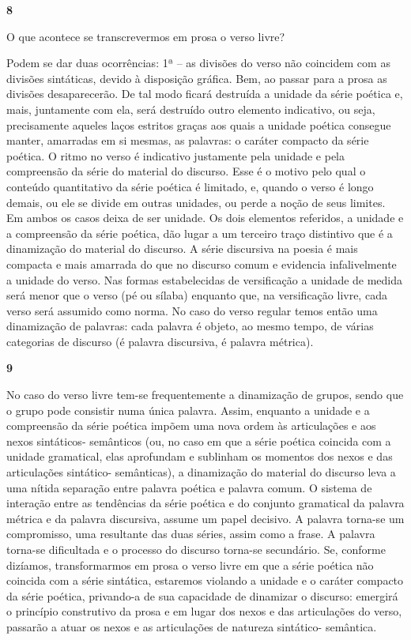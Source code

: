 \textbf{8}

O que acontece se transcrevermos em prosa o verso livre?

Podem se dar duas ocorrências: 1ª -- as divisões do verso não coincidem
com as divisões sintáticas, devido à disposição gráfica. Bem, ao passar
para a prosa as divisões desaparecerão. De tal modo ficará destruída a
unidade da série poética e, mais, juntamente com ela, será destruído
outro elemento indicativo, ou seja, precisamente aqueles laços estritos
graças aos quais a unidade poética consegue manter, amarradas em si
mesmas, as palavras: o caráter compacto da série poética. O ritmo no
verso é indicativo justamente pela unidade e pela compreensão da série
do material do discurso. Esse é o motivo pelo qual o conteúdo
quantitativo da série poética é limitado, e, quando o verso é longo
demais, ou ele se divide em outras unidades, ou perde a noção de seus
limites. Em ambos os casos deixa de ser unidade. Os dois elementos
referidos, a unidade e a compreensão da série poética, dão lugar a um
terceiro traço distintivo que é a dinamização do material do discurso. A
série discursiva na poesia é mais compacta e mais amarrada do que no
discurso comum e evidencia infalivelmente a unidade do verso. Nas formas
estabelecidas de versificação a unidade de medida será menor que o verso
(pé ou sílaba) enquanto que, na versificação livre, cada verso será
assumido como norma. No caso do verso regular temos então uma
dinamização de palavras: cada palavra é objeto, ao mesmo tempo, de
várias categorias de discurso (é palavra discursiva, é palavra métrica).

\textbf{9}

No caso do verso livre tem-se frequentemente a dinamização de grupos,
sendo que o grupo pode consistir numa única palavra. Assim, enquanto a
unidade e a compreensão da série poética impõem uma nova ordem às
articulações e aos nexos sintáticos- semânticos (ou, no caso em que a
série poética coincida com a unidade gramatical, elas aprofundam e
sublinham os momentos dos nexos e das articulações sintático-
semânticas), a dinamização do material do discurso leva a uma nítida
separação entre palavra poética e palavra comum. O sistema de interação
entre as tendências da série poética e do conjunto gramatical da palavra
métrica e da palavra discursiva, assume um papel decisivo. A palavra
torna-se um compromisso, uma resultante das duas séries, assim como a
frase. A palavra torna-se dificultada e o processo do discurso torna-se
secundário. Se, conforme dizíamos, transformarmos em prosa o verso livre
em que a série poética não coincida com a série sintática, estaremos
violando a unidade e o caráter compacto da série poética, privando-a de
sua capacidade de dinamizar o discurso: emergirá o princípio construtivo
da prosa e em lugar dos nexos e das articulações do verso, passarão a
atuar os nexos e as articulações de natureza sintático- semântica.

